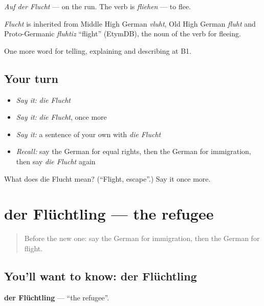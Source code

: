 \emph{Auf der Flucht} — on the run. The verb is \emph{fliehen} — to flee.

\begin{cousinweb}
\emph{Flucht} is inherited from Middle High German \emph{vluht}, Old High German \emph{fluht} and Proto-Germanic \emph{fluhtiz} \textquotedblleft{}flight\textquotedblright{} (EtymDB), the noun of the verb for fleeing.
\end{cousinweb}

\begin{grammarlens}[title={What you've built}]
One more word for telling, explaining and describing at B1.
\end{grammarlens}

\subsection*{Your turn}
\begin{itemize}
\raggedright
  \item \emph{Say it:} \emph{die Flucht}
  \item \emph{Say it:} \emph{die Flucht}, once more
  \item \emph{Say it:} a sentence of your own with \emph{die Flucht}
  \item \emph{Recall:} say the German for equal rights, then the German for immigration, then say \emph{die Flucht} again
\end{itemize}

\begin{tcolorbox}[breakable,colback=teal!4,colframe=teal!35!black,title={Before you move on}]
What does die Flucht mean? (\textquotedblleft{}Flight, escape\textquotedblright{}.) Say it once more.
\end{tcolorbox}
\section[der Flüchtling]{der Flüchtling — the refugee}

\label{lesson:GE-C361-fluechtling}



\begin{quote}
Before the new one: say the German for immigration, then the German for flight.
\end{quote}

\subsection*{You'll want to know: der Flüchtling}
\textbf{der Flüchtling} — \textquotedblleft{}the refugee\textquotedblright{}.

